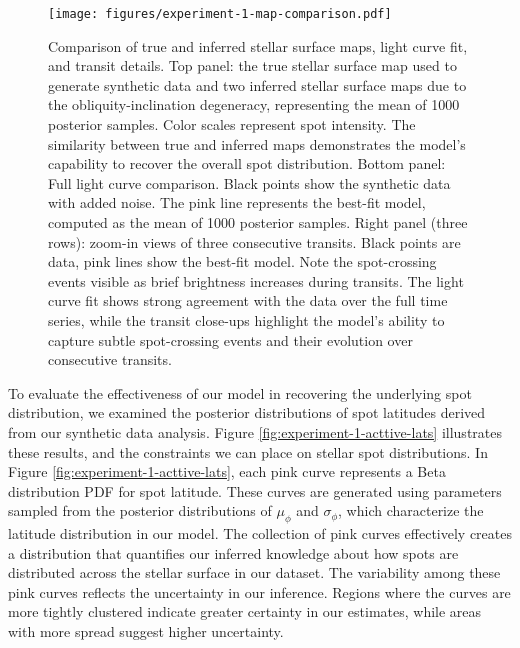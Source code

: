 \documentclass[twocolumn]{aastex631}
\begin{document}
%
\begin{figure*}[hbt!]
    \begin{centering}
        \texttt{[image: figures/experiment-1-map-comparison.pdf]}
        \caption{
            Comparison of true and inferred stellar surface maps, light curve fit, and transit details. Top panel: the true stellar surface map used to 
            generate synthetic data and two inferred stellar surface maps due to the obliquity-inclination degeneracy, representing the mean of 1000 posterior samples. Color scales represent spot 
            intensity. The similarity between true and inferred maps demonstrates the model's capability to recover the overall spot distribution. Bottom panel:
            Full light curve comparison. Black points show the synthetic data with added noise. The pink line represents the best-fit model, 
            computed as the mean of 1000 posterior samples. Right panel (three rows): zoom-in views of three consecutive transits. Black points are data, 
            pink lines show the best-fit model. Note the spot-crossing events visible as brief brightness increases during transits. 
            The light curve fit shows strong agreement with the data over the full time series, while the transit close-ups highlight the model's ability 
            to capture subtle spot-crossing events and their evolution over consecutive transits.
        }
        \label{fig:experiment-1-map-comparison}
    \end{centering}
\end{figure*}
%
To evaluate the effectiveness of our model in recovering the underlying spot distribution, we examined the posterior distributions of spot latitudes 
derived from our synthetic data analysis. Figure \ref{fig:experiment-1-acttive-lats} illustrates these results, and the constraints we can place on 
stellar spot distributions. In Figure \ref{fig:experiment-1-acttive-lats}, each pink curve represents a Beta distribution PDF for spot latitude. 
These curves are generated using parameters sampled from the posterior distributions of $\mu_\phi$ and $\sigma_\phi$, which characterize the 
latitude distribution in our model. The collection of pink curves effectively creates a distribution that quantifies our inferred knowledge about 
how spots are distributed across the stellar surface in our dataset. The variability among these pink curves reflects the uncertainty in our inference. 
Regions where the curves are more tightly clustered indicate greater certainty in our estimates, while areas with more spread suggest higher uncertainty. 
\end{document}

